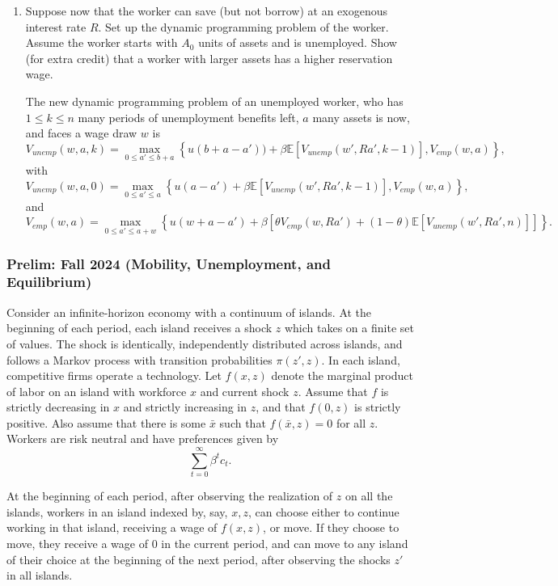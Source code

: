 \documentclass[11pt,english]{article}
\begin{document}
\begin{enumerate}
 \item Suppose now that the worker can save (but not borrow) at an exogenous
 interest rate $R$. Set up the dynamic programming problem of the worker.
 Assume the worker starts with $A_0$ units of assets and is unemployed.
 Show (for extra credit) that a worker with larger assets has a higher
 reservation wage.
 \begin{solution}
 The new dynamic programming problem of an unemployed worker, who has $1 \leq k \leq n$ many periods of unemployment benefits left, $a$ many assets is now, and faces a wage draw $w$ is $$V_{unemp}(w,a,k) = \max_{0\leq a'\leq b+a}\left\{u(b + a-a')) + \beta \mathbb{E}[V_{unemp}(w',Ra',k-1)], V_{emp}(w, a)\right\},$$ with$$V_{unemp}(w,a,0) = \max_{0 \leq a' \leq a}\left\{u(a-a') + \beta \mathbb{E}[V_{unemp}(w',Ra',k-1)], V_{emp}(w, a)\right\},$$ and $$V_{emp}(w, a) = \max_{0 \leq a' \leq a+w}\left\{u(w + a - a') + \beta\left[\theta V_{emp}(w, Ra') + (1 - \theta) \mathbb{E}[V_{unemp}(w',Ra',n)]\right]\right\}.$$
 \end{solution}
\end{enumerate}

\subsubsection{Prelim: Fall 2024 (Mobility, Unemployment, and Equilibrium)}
Consider an infinite-horizon economy with a continuum of islands. At the
beginning of each period, each island receives a shock $z$ which takes on a
finite set of values. The shock is identically, independently distributed
across islands, and follows a Markov process with transition probabilities
$\pi(z', z)$. In each island, competitive firms operate a technology. Let
$f(x, z)$ denote the marginal product of labor on an island with workforce $x$
and current shock $z$. Assume that $f$ is strictly decreasing in $x$ and
strictly increasing in $z$, and that $f(0, z)$ is strictly positive. Also
assume that there is some $\bar{x}$ such that $f(\bar{x}, z) = 0$ for all $z$.
Workers are risk neutral and have preferences given by
\[
    \sum_{t=0}^{\infty} \beta^t c_t.
\]
 
At the beginning of each period, after observing the realization of $z$ on all
the islands, workers in an island indexed by, say, $x, z$, can choose either
to continue working in that island, receiving a wage of $f(x, z)$, or move. If
they choose to move, they receive a wage of 0 in the current period, and can
move to any island of their choice at the beginning of the next period, after
observing the shocks $z'$ in all islands.
 
\end{document}
